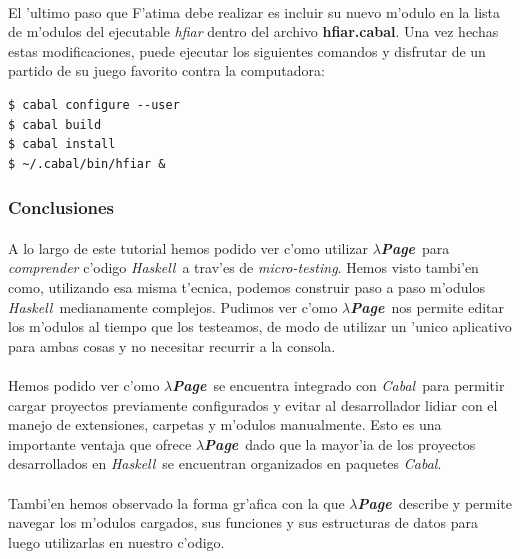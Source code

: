\documentclass[a4paper]{article}
\newcommand{\haskell}{\textsl{Haskell}}
\newcommand{\hpage}{\textbf{\textsl{$\lambda$Page}}}
\newcommand{\cabal}{\textsl{Cabal}}
\begin{document}
\paragraph{}El 'ultimo paso que F'atima debe realizar es incluir su nuevo m'odulo en la lista de m'odulos del ejecutable \textsl{hfiar} dentro del archivo \textbf{hfiar.cabal}.  Una vez hechas estas modificaciones, puede ejecutar los siguientes comandos y disfrutar de un partido de su juego favorito contra la computadora:
\lstset{language=sh, frame=single, tabsize=4}
\begin{center}\begin{lstlisting}
$ cabal configure --user
$ cabal build
$ cabal install
$ ~/.cabal/bin/hfiar &
\end{lstlisting}\end{center}

\newpage
\subsubsection{Conclusiones}
\paragraph{}A lo largo de este tutorial hemos podido ver c'omo utilizar \hpage\ para \textsl{comprender} c'odigo \haskell\ a trav'es de \textsl{micro-testing}.  Hemos visto tambi'en como, utilizando esa misma t'ecnica, podemos construir paso a paso m'odulos \haskell\ medianamente complejos.  Pudimos ver c'omo \hpage\ nos permite editar los m'odulos al tiempo que los testeamos, de modo de utilizar un 'unico aplicativo para ambas cosas y no necesitar recurrir a la consola.
\paragraph{}Hemos podido ver c'omo \hpage\ se encuentra integrado con \cabal\ para permitir cargar proyectos previamente configurados y evitar al desarrollador lidiar con el manejo de extensiones, carpetas y m'odulos manualmente.  Esto es una importante ventaja que ofrece \hpage\, dado que la mayor'ia de los proyectos desarrollados en \haskell\ se encuentran organizados en paquetes \cabal.
\paragraph{}Tambi'en hemos observado la forma gr'afica con la que \hpage\ describe y permite navegar los m'odulos cargados, sus funciones y sus estructuras de datos para luego utilizarlas en nuestro c'odigo.
\end{document}
